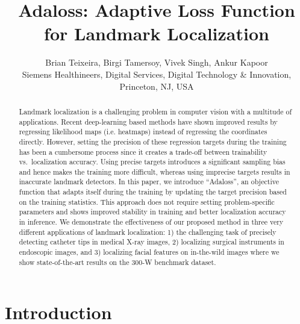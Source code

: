 \documentclass[10pt,twocolumn,letterpaper]{article}
\begin{document}
\title{Adaloss: Adaptive Loss Function for Landmark Localization}



\author{
  Brian Teixeira, Birgi Tamersoy, Vivek Singh, Ankur Kapoor \\
  Siemens Healthineers, Digital Services, Digital Technology \& Innovation, \\
  Princeton, NJ, USA
}

\maketitle

\begin{abstract}


Landmark localization is a challenging problem in computer vision with a multitude of applications. Recent deep-learning based methods have shown improved results by regressing likelihood maps (i.e. heatmaps) instead of regressing the coordinates directly. However, setting the precision of these regression targets during the training has been a cumbersome process since it creates a trade-off between trainability vs.\ localization accuracy. Using precise targets introduces a significant sampling bias and hence makes the training more difficult, whereas using imprecise targets results in inaccurate landmark detectors. In this paper, we introduce ``Adaloss'', an objective function that adapts itself during the training by updating the target precision based on the training statistics. This approach does not require setting problem-specific parameters and shows improved stability in training and better localization accuracy in inference. We demonstrate the effectiveness of our proposed method in three very different applications of landmark localization: 1) the challenging task of precisely detecting catheter tips in medical X-ray images\footnotemark, 2) localizing surgical instruments in endoscopic images\footnotemark[\value{footnote}], and 3) localizing facial features on in-the-wild images where we show state-of-the-art results on the 300-W benchmark dataset. 




\end{abstract}


\section{Introduction}
\end{document}
